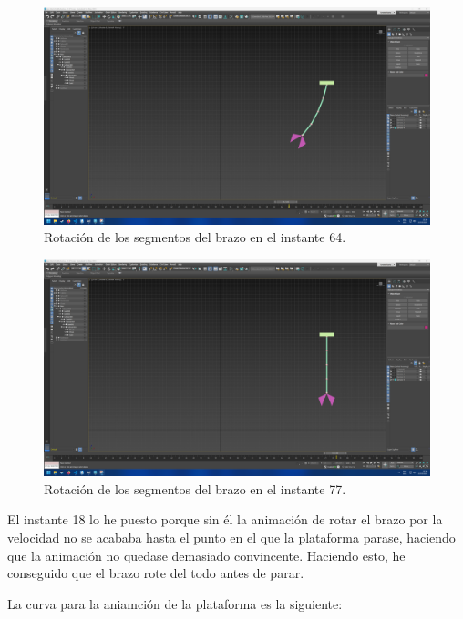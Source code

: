 \documentclass{article}
\begin{document}
\begin{figure}[H]
    \centering
    \includegraphics[width=\textwidth]{imagenes/Ejercicio4/keyframes/64.png}
    \caption{Rotación de los segmentos del brazo en el instante 64.}
\end{figure}


\begin{figure}[H]
    \centering
    \includegraphics[width=\textwidth]{imagenes/Ejercicio4/keyframes/77.png}
    \caption{Rotación de los segmentos del brazo en el instante 77.}
\end{figure}

El instante 18 lo he puesto porque sin él la animación de rotar el brazo por la velocidad no se acababa hasta el punto en el que la plataforma parase, haciendo que la animación no quedase demasiado convincente. Haciendo esto, he conseguido que el brazo rote del todo antes de parar.

La curva para la aniamción de la plataforma es la siguiente:
\end{document}
